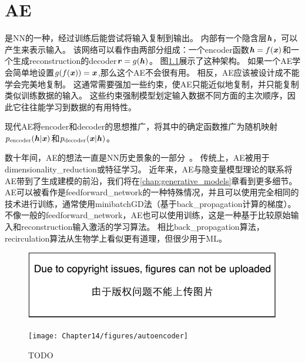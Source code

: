\chapter{\gls{AE}}
\label{chap:autoencoders}
是\gls{NN}的一种，经过训练后能尝试将输入复制到输出。
内部有一个隐含层$\boldsymbol{\mathit{h}}$，可以产生来表示输入。
该网络可以看作由两部分组成：一个\gls{encoder}函数$ \boldsymbol{\mathit{h}} = f(\boldsymbol{\mathit{x}})$和一个生成\gls{reconstruction}的\gls{decoder}$\boldsymbol{\mathit{r}}=g(\boldsymbol{\mathit{h}})$。
图\ref{fig:chap14_autoencoder}展示了这种架构。
如果一个\gls{AE}学会简单地设置$g(f(\boldsymbol{\mathit{x}})) =\boldsymbol{\mathit{x}}$,那么这个\gls{AE}不会很有用。
相反，\gls{AE}应该被设计成不能学会完美地复制。
这通常需要强加一些约束，使\gls{AE}只能近似地复制，并只能复制类似训练数据的输入。
这些约束强制模型划定输入数据不同方面的主次顺序，因此它往往能学习到数据的有用特性。


现代\gls{AE}将\gls{encoder}和\gls{decoder}的思想推广，将其中的确定函数推广为随机映射$p_{\text{encoder}} (\boldsymbol{\mathit{h}} | \boldsymbol{\mathit{x}})$和$p_{\text{decoder}}(\boldsymbol{\mathit{x}} | \boldsymbol{\mathit{h}})$。


数十年间，\gls{AE}的想法一直是\gls{NN}历史景象的一部分~\citep{Lecun-these87,Bourlard88,hinton1994amd-small}。
传统上，\gls{AE}被用于\gls{dimensionality_reduction}或特征学习。
近年来，\gls{AE}与隐变量模型理论的联系将\gls{AE}带到了生成建模的前沿，我们将在\ref{chap:generative_models}章看到更多细节。
\gls{AE}可以被看作是\gls{feedforward_network}的一种特殊情况，并且可以使用完全相同的技术进行训练，通常使用\gls{minibatch}\gls{GD}法（基于\gls{back_propagation}计算的梯度）。
不像一般的\gls{feedforward_network}，\gls{AE}也可以使用训练\citep{Hinton+McClelland-NIPS1987}，这是一种基于比较原始输入和\gls{reconstruction}输入激活的学习算法。
相比\gls{back_propagation}算法，\gls{recirculation}算法从生物学上看似更有道理，但很少用于\gls{ML}。

\begin{figure}[!htb]
\ifOpenSource
\centerline{\includegraphics{figure.pdf}}
\else
\centerline{\texttt{[image: Chapter14/figures/autoencoder]}}
\fi
\caption{TODO}
\label{fig:chap14_autoencoder}
\end{figure}


